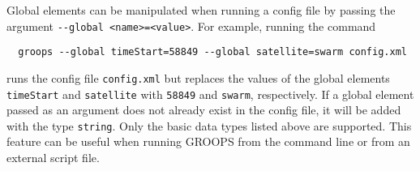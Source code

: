 Global elements can be manipulated when running a config file by passing the argument \verb|--global <name>=<value>|.
For example, running the command
\begin{verbatim}
  groops --global timeStart=58849 --global satellite=swarm config.xml
\end{verbatim}
runs the config file \verb|config.xml| but replaces the values of the global elements \verb|timeStart|
and \verb|satellite| with \verb|58849| and \verb|swarm|, respectively. If a global element passed as
an argument does not already exist in the config file, it will be added with the type \verb|string|.
Only the basic data types listed above are supported. This feature can be useful when running GROOPS
from the command line or from an external script file.

